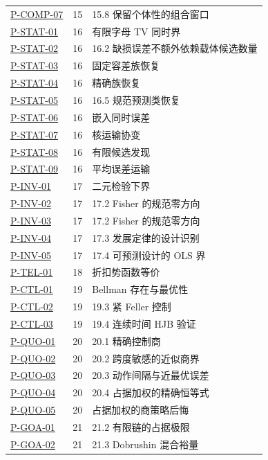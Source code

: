 \documentclass[
  11pt,
  oneside]{book}
\begin{document}
{\begin{longtable}[]{@{}lrl@{}}
\hyperref[p-comp-07]{P-COMP-07} & 15 & 15.8 保留个体性的组合窗口 \\
\hyperref[p-stat-01]{P-STAT-01} & 16 & 有限字母 TV 同时界 \\
\hyperref[p-stat-02]{P-STAT-02} & 16 & 16.2 缺损误差不额外依赖载体候选数量 \\
\hyperref[p-stat-03]{P-STAT-03} & 16 & 固定容差族恢复 \\
\hyperref[p-stat-04]{P-STAT-04} & 16 & 精确族恢复 \\
\hyperref[p-stat-05]{P-STAT-05} & 16 & 16.5 规范预测类恢复 \\
\hyperref[p-stat-06]{P-STAT-06} & 16 & 嵌入同时误差 \\
\hyperref[p-stat-07]{P-STAT-07} & 16 & 核运输协变 \\
\hyperref[p-stat-08]{P-STAT-08} & 16 & 有限候选发现 \\
\hyperref[p-stat-09]{P-STAT-09} & 16 & 平均误差运输 \\
\hyperref[p-inv-01]{P-INV-01} & 17 & 二元检验下界 \\
\hyperref[p-inv-02]{P-INV-02} & 17 & 17.2 Fisher 的规范零方向 \\
\hyperref[p-inv-03]{P-INV-03} & 17 & 17.2 Fisher 的规范零方向 \\
\hyperref[p-inv-04]{P-INV-04} & 17 & 17.3 发展定律的设计识别 \\
\hyperref[p-inv-05]{P-INV-05} & 17 & 17.4 可预测设计的 OLS 界 \\
\hyperref[p-tel-01]{P-TEL-01} & 18 & 折扣势函数等价 \\
\hyperref[p-ctl-01]{P-CTL-01} & 19 & Bellman 存在与最优性 \\
\hyperref[p-ctl-02]{P-CTL-02} & 19 & 19.3 紧 Feller 控制 \\
\hyperref[p-ctl-03]{P-CTL-03} & 19 & 19.4 连续时间 HJB 验证 \\
\hyperref[p-quo-01]{P-QUO-01} & 20 & 20.1 精确控制商 \\
\hyperref[p-quo-02]{P-QUO-02} & 20 & 20.2 跨度敏感的近似商界 \\
\hyperref[p-quo-03]{P-QUO-03} & 20 & 20.3 动作间隔与近最优误差 \\
\hyperref[p-quo-04]{P-QUO-04} & 20 & 20.4 占据加权的精确恒等式 \\
\hyperref[p-quo-05]{P-QUO-05} & 20 & 占据加权的商策略后悔 \\
\hyperref[p-goa-01]{P-GOA-01} & 21 & 21.2 有限链的占据极限 \\
\hyperref[p-goa-02]{P-GOA-02} & 21 & 21.3 Dobrushin 混合裕量 \\

\end{longtable}}
\end{document}
